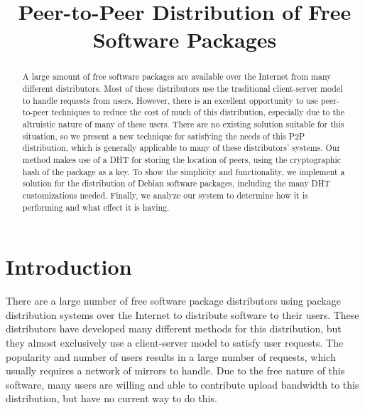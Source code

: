 \documentclass[conference]{IEEEtran}
\begin{document}
\title{Peer-to-Peer Distribution of Free Software Packages}
\author{
\and
{}
}

\maketitle

\begin{abstract}
A large amount of free software packages are available over the
Internet from many different distributors. Most of these
distributors use the traditional client-server model to handle
requests from users. However, there is an excellent opportunity to
use peer-to-peer techniques to reduce the cost of much of this
distribution, especially due to the altruistic nature of many of
these users. There are no existing solution suitable for this
situation, so we present a new technique for satisfying the needs of
this P2P distribution, which is generally applicable to many of
these distributors' systems. Our method makes use of a DHT for
storing the location of peers, using the cryptographic hash of the
package as a key. To show the simplicity and functionality, we
implement a solution for the distribution of Debian software
packages, including the many DHT customizations needed. Finally, we
analyze our system to determine how it is performing and what effect
it is having.
\end{abstract}


\section{Introduction}
\label{intro}

There are a large number of free software package distributors using
package distribution systems over the Internet to distribute
software to their users. These distributors have developed many
different methods for this distribution, but they almost exclusively
use a client-server model to satisfy user requests. The popularity
and number of users results in a large number of requests, which
usually requires a network of mirrors to handle. Due to the free
nature of this software, many users are willing and able to
contribute upload bandwidth to this distribution, but have no
current way to do this.
\end{document}
